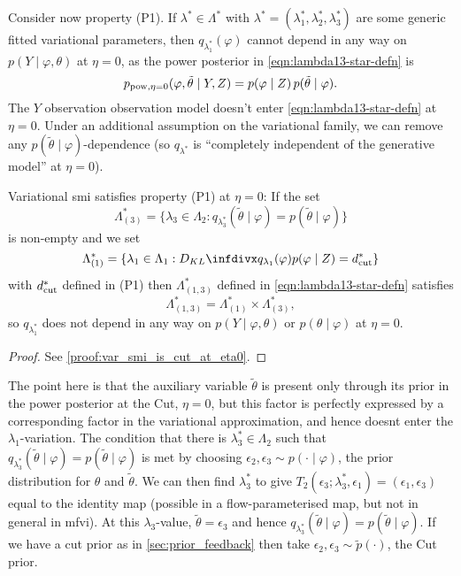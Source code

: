 Consider now property (P1). If $\lambda^*\in\Lambda^*$ with $\lambda^*=(\lambda^*_1,\lambda^*_2,\lambda^*_3)$ are some generic fitted variational parameters, then $q_{\lambda^*_1}(\varphi)$ cannot depend in any way on $p(Y\mid \varphi,\theta)$ at $\eta=0$, as the power posterior in \cref{eqn:lambda13-star-defn} is
\[
  p_{\operatorname{\text{pow}}, \eta=0}(\varphi,\tilde\theta \mid Y,Z)=p(\varphi \mid Z)\,p(\tilde\theta\mid \varphi).
\]
The $Y$ observation observation model doesn't enter \cref{eqn:lambda13-star-defn} at $\eta=0$.
Under an additional assumption on the variational family, we can remove any $p(\tilde\theta \mid \varphi)$-dependence (so $q_{\lambda^*}$ is ``completely independent of the generative model'' at $\eta=0$).

\begin{proposition}\label{prop:var_smi_is_cut_at_eta0}
  Variational \acrshort*{smi} satisfies property (P1) at $\eta=0$: If the set
  \[
    \Lambda^*_{(3)}=\{\lambda_3\in \Lambda_2: q_{\lambda^*_3}(\tilde\theta\mid \varphi)=p(\tilde\theta\mid \varphi)\}
  \]
  is non-empty and we set
  \[
    \Lambda^*_{(1)} =   \{\lambda_1\in \Lambda_1:
    \kl{q_{\lambda_1}(\varphi)}{p(\varphi \mid Z)}=d^*_{\cut}\}
  \]
  with $d^*_{\operatorname{\text{cut}}}$ defined in (P1) then $\Lambda^*_{(1,3)}$ defined in \cref{eqn:lambda13-star-defn} satisfies
  \[
    \Lambda^*_{(1,3)} = \Lambda^*_{(1)} \times \Lambda^*_{(3)},
  \]
  so $q_{\lambda^*_1}$ does not depend in any way on $p(Y \mid \varphi,\theta)$ or $p(\theta \mid \varphi)$ at $\eta=0$.
\end{proposition}
\begin{proof}
  See \cref{proof:var_smi_is_cut_at_eta0}.
\end{proof}

The point here is that the auxiliary variable $\tilde\theta$ is present only through its prior in the power posterior at the Cut, $\eta=0$, but this factor is perfectly expressed by a corresponding factor in the variational approximation, and hence doesnt enter the $\lambda_1$-variation.
The condition that there is $\lambda^*_3\in \Lambda_2$ such that $q_{\lambda^*_3}(\tilde\theta\mid \varphi)=p(\tilde\theta\mid \varphi)$ is met by choosing $\epsilon_2,\epsilon_3\sim p(\cdot\mid \varphi)$, the prior distribution for $\theta$ and $\tilde\theta$.
We can then find $\lambda^*_3$ to give $T_2(\epsilon_3;\lambda^*_3,\epsilon_1)=(\epsilon_1,\epsilon_3)$ equal to the identity map (possible in a flow-parameterised map, but not in general in \acrshort*{mfvi}).
At this $\lambda_3$-value, $\tilde\theta=\epsilon_3$ and hence $q_{\lambda^*_3}(\tilde\theta\mid \varphi)=p(\tilde\theta\mid \varphi)$. If we have a cut prior as in \cref{sec:prior_feedback} then take $\epsilon_2,\epsilon_3\sim \tilde p(\cdot)$, the Cut prior.

